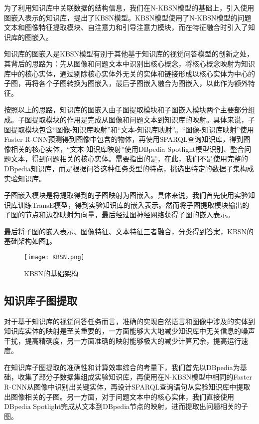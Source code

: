 为了利用知识库中关联数据的结构信息，我们在N-KBSN模型的基础上，引入使用图嵌入表示的知识库，提出了KBSN模型。KBSN模型使用了N-KBSN模型的问题文本和图像特征提取模块、自注意力和引导注意力模块，而在特征融合时引入了知识库的图嵌入。

知识库的图嵌入是KBSN模型有别于其他基于知识库的视觉问答模型的创新之处，其背后的思路为：先从图像和问题文本中识别出核心概念，将核心概念映射为知识库中的核心实体，通过剔除核心实体外无关的实体和链接形成以核心实体为中心的子图，再将各个子图转换为图嵌入，最后子图嵌入融合为图嵌入，以此作为额外特征。

按照以上的思路，知识库的图嵌入由子图提取模块和子图嵌入模块两个主要部分组成。子图提取模块的作用是完成从图像和问题文本到知识库的映射。具体来说，子图提取模块包含“图像-知识库映射”和“文本-知识库映射”。“图像-知识库映射”使用Faster R-CNN预测得到图像中包含的物体，再使用SPARQL查询知识库，得到图像相关的核心实体，“文本-知识库映射”使用DBpedia Spotlight模型识别、整合问题文本，得到问题相关的核心实体。需要指出的是，在此，我们不是使用完整的DBpedia知识库，而是根据问答这种任务类型的特点，挑选出特定的数据子集构成实验知识库。

子图嵌入模块是将提取得到的子图映射为图嵌入。具体来说，我们首先使用实验知识库训练TransE模型，得到实验知识库的嵌入表示。然而将子图提取模块输出的子图的节点和边都映射为向量，最后经过图神经网络获得子图的嵌入表示。

最后将子图的嵌入表示、图像特征、文本特征三者融合，分类得到答案，KBSN的基础架构如图\ref{KBSN}。
\begin{figure}[H]
	\centering
	\texttt{[image: KBSN.png]}
	\caption{KBSN的基础架构}
	\label{KBSN}
\end{figure}

\subsection{知识库子图提取}
对于基于知识库的视觉问答任务而言，准确的实现自然语言和图像中涉及的实体到知识库实体的映射是至关重要的，一方面能够大大地减少知识库中无关信息的噪声干扰，提高精确度，另一方面准确的映射能够极大的减少计算冗余，提高运行速度。

在知识库子图提取的准确性和计算效率综合的考量下，我们首先以DBpedia为基础，收集了部分子数据集组成实验知识库，再使用在N-KBSN模型中相同的Faster R-CNN从图像中识别出关键实体，再设计SPARQL查询语句从实验知识库中提取出图像相关的子图。另一方面，对于问题文本中的核心实体，我们直接使用DBpedia Spotlight完成从文本到DBpedia节点的映射，进而提取出问题相关的子图。

